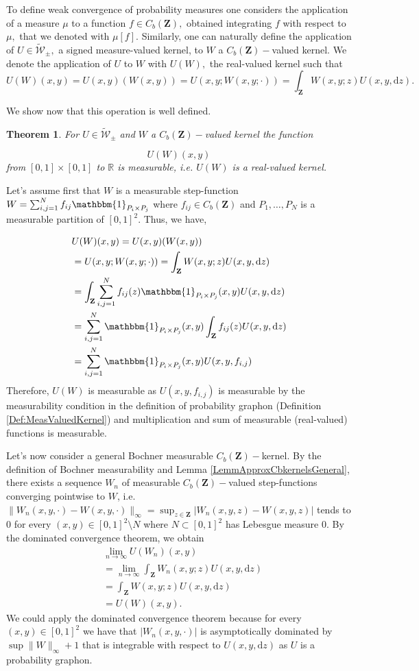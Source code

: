 \documentclass[11pt]{article}
\newtheorem{theorem}{Theorem}[section]
\def\R{\mathbb{R}}
\newcommand{\Space}{\mathbf{Z}}
\newcommand{\signed}{\pm}
\newcommand{\CbFunct}{C_b(\Space)}
\newcommand{\UKernel}{\widetilde{\mathcal{W}}_{\signed}}
\newcommand{\drv}{\mathrm{d}}
\begin{document}
To define weak convergence of probability measures one considers the application of a measure $\mu$ to a function $f\in\CbFunct,$ obtained integrating $f$ with respect to $\mu,$ that we denoted with $\mu[f].$ Similarly, one can naturally define the application of $U\in \UKernel,$ a signed measure-valued kernel, to $W$ a $\CbFunct-$valued kernel. We denote the application of $U$ to $W$ with $U(W),$ the real-valued kernel such that $$U(W)(x,y)=U(x,y)(W(x,y))=U(x,y;W(x,y;\cdot))=\int_{\Space}W(x,y;z)U(x,y,\drv z).$$

We show now that this operation is well defined.

\begin{theorem}
For $U\in \UKernel$ and $W$ a $\CbFunct-$valued kernel the function 

$$U(W)(x,y)$$
from $[0,1]\times [0,1]$ to $\R$ is measurable, i.e. $U(W)$ is a real-valued kernel.
\end{theorem}
\proof
Let's assume first that $W$ is a measurable step-function $W=\sum^N_{i,j=1}f_{ij} \mathbbm{1}_{P_i\times P_j}$ where $f_{ij} \in \CbFunct $  and $P_1,\ldots,P_N$ is a measurable partition of $[0,1]^2.$ Thus, we have,

$$
\begin{aligned}&U(W)(x,y)=U(x,y)(W(x,y))\\
&=U(x,y;W(x,y;\cdot))=\int_{\Space}W(x,y;z)U(x,y,\drv z)\\
&= \int_{\Space}\sum^N_{i,j=1}f_{ij}(z) \mathbbm{1}_{P_i\times P_j}(x,y)U(x,y,\drv z)\\
&=\sum^N_{i,j=1} \mathbbm{1}_{P_i\times P_j}(x,y)\int_{\Space}f_{ij}(z) U(x,y,\drv z)\\
&=\sum^N_{i,j=1} \mathbbm{1}_{P_i\times P_j}(x,y) U(x,y,f_{i,j})
\end{aligned}$$
Therefore, $U(W)$ is measurable as $U(x,y,f_{i,j})$ is measurable by the measurability condition in the definition of probability graphon (Definition \ref{Def:MeasValuedKernel}) and multiplication and sum of measurable (real-valued) functions is measurable.

Let's now consider a general Bochner measurable $\CbFunct-$kernel. By the definition of Bochner measurability and Lemma \ref{LemmApproxCbkernelsGeneral}, there exists a sequence $W_n$ of measurable $\CbFunct-$valued step-functions converging pointwise to $W$, i.e.\ $\|W_n(x,y,\cdot)-W(x,y,\cdot)\|_{\infty}=\sup_{z\in \Space}|W_n(x,y,z)-W(x,y,z)|$ tends to $0$ for every $(x,y)\in [0,1]^2\setminus N$ where $N\subset[0,1]^2$ has Lebesgue measure $0.$  By the dominated convergence theorem, we obtain
$$
\begin{aligned}
&\lim_{n\rightarrow \infty}U(W_n)(x,y)\\
&=\lim_{n\rightarrow \infty}\int_{\Space}W_n(x,y;z)U(x,y,\drv z)\\
&=\int_{\Space}W(x,y;z)U(x,y,\drv z)\\
&= U(W)(x,y).
\end{aligned}
$$
We could apply the dominated convergence theorem because for every $(x,y)\in[0,1]^2$ we have that $|W_n(x,y,\cdot)|$ is asymptotically dominated by $\sup\|W\|_{\infty}+1$ that is integrable with respect to $U(x,y,\mathrm{d}z)$ as $U$ is a probability graphon. 
\end{document}
